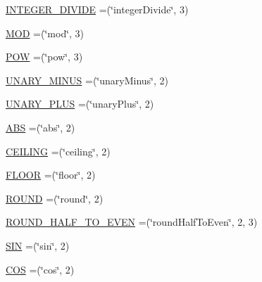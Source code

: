\begin{DoxyCompactItemize}
\item 
\hyperlink{enumorg_1_1semanticweb_1_1owlapi_1_1vocab_1_1_s_w_r_l_built_ins_vocabulary_aa304d8794e5121aa179b066c4f85bfff}{I\-N\-T\-E\-G\-E\-R\-\_\-\-D\-I\-V\-I\-D\-E} =(\char`\"{}integer\-Divide\char`\"{}, 3)
\item 
\hyperlink{enumorg_1_1semanticweb_1_1owlapi_1_1vocab_1_1_s_w_r_l_built_ins_vocabulary_a7a54af9e370b73bdea1b5adf566e0a24}{M\-O\-D} =(\char`\"{}mod\char`\"{}, 3)
\item 
\hyperlink{enumorg_1_1semanticweb_1_1owlapi_1_1vocab_1_1_s_w_r_l_built_ins_vocabulary_a87693b78dcd58f69d8b1a41e8bb1d27a}{P\-O\-W} =(\char`\"{}pow\char`\"{}, 3)
\item 
\hyperlink{enumorg_1_1semanticweb_1_1owlapi_1_1vocab_1_1_s_w_r_l_built_ins_vocabulary_a1a8b35c60f8c6fed3c16a3599235e37f}{U\-N\-A\-R\-Y\-\_\-\-M\-I\-N\-U\-S} =(\char`\"{}unary\-Minus\char`\"{}, 2)
\item 
\hyperlink{enumorg_1_1semanticweb_1_1owlapi_1_1vocab_1_1_s_w_r_l_built_ins_vocabulary_af1edd19c5fde510f5e8c22124898dc27}{U\-N\-A\-R\-Y\-\_\-\-P\-L\-U\-S} =(\char`\"{}unary\-Plus\char`\"{}, 2)
\item 
\hyperlink{enumorg_1_1semanticweb_1_1owlapi_1_1vocab_1_1_s_w_r_l_built_ins_vocabulary_a04928f97476501d75315598e931ab9fa}{A\-B\-S} =(\char`\"{}abs\char`\"{}, 2)
\item 
\hyperlink{enumorg_1_1semanticweb_1_1owlapi_1_1vocab_1_1_s_w_r_l_built_ins_vocabulary_aae4299e328eefcc926d0270ba4a1cbab}{C\-E\-I\-L\-I\-N\-G} =(\char`\"{}ceiling\char`\"{}, 2)
\item 
\hyperlink{enumorg_1_1semanticweb_1_1owlapi_1_1vocab_1_1_s_w_r_l_built_ins_vocabulary_a17e3132f56f7798d16ecfe7fdfc1fead}{F\-L\-O\-O\-R} =(\char`\"{}floor\char`\"{}, 2)
\item 
\hyperlink{enumorg_1_1semanticweb_1_1owlapi_1_1vocab_1_1_s_w_r_l_built_ins_vocabulary_a786ae3047e07d85f1ca9c13b0b5ec36d}{R\-O\-U\-N\-D} =(\char`\"{}round\char`\"{}, 2)
\item 
\hyperlink{enumorg_1_1semanticweb_1_1owlapi_1_1vocab_1_1_s_w_r_l_built_ins_vocabulary_a3a82315e3389448a89b57d67dba132b8}{R\-O\-U\-N\-D\-\_\-\-H\-A\-L\-F\-\_\-\-T\-O\-\_\-\-E\-V\-E\-N} =(\char`\"{}round\-Half\-To\-Even\char`\"{}, 2, 3)
\item 
\hyperlink{enumorg_1_1semanticweb_1_1owlapi_1_1vocab_1_1_s_w_r_l_built_ins_vocabulary_a1e6162d6f9a5532fe8a145992e38d4fa}{S\-I\-N} =(\char`\"{}sin\char`\"{}, 2)
\item 
\hyperlink{enumorg_1_1semanticweb_1_1owlapi_1_1vocab_1_1_s_w_r_l_built_ins_vocabulary_ae094adcdcdb4e2e16592a130c5c4d65e}{C\-O\-S} =(\char`\"{}cos\char`\"{}, 2)

\end{DoxyCompactItemize}
